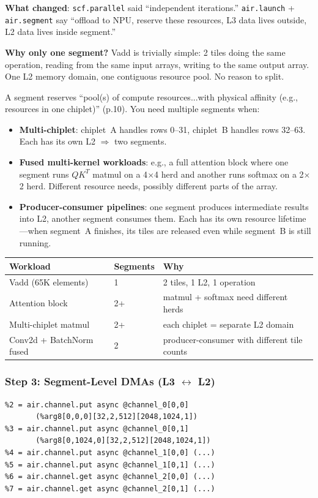 \documentclass[11pt,a4paper]{article}
\begin{document}
\textbf{What changed}: \texttt{scf.parallel} said ``independent iterations.''
\texttt{air.launch} + \texttt{air.segment} say ``offload to NPU, reserve these
resources, L3 data lives outside, L2 data lives inside segment.''

\textbf{Why only one segment?} Vadd is trivially simple: 2 tiles doing the same
operation, reading from the same input arrays, writing to the same output array.
One L2 memory domain, one contiguous resource pool. No reason to split.

A segment reserves ``pool(s) of compute resources...with physical affinity
(e.g., resources in one chiplet)'' (p.10). You need multiple segments when:

\begin{itemize}[leftmargin=2em]
  \item \textbf{Multi-chiplet}: chiplet~A handles rows 0--31, chiplet~B handles
    rows 32--63. Each has its own L2 $\Rightarrow$ two segments.
  \item \textbf{Fused multi-kernel workloads}: e.g., a full attention block where
    one segment runs $QK^T$ matmul on a 4$\times$4 herd and another runs softmax
    on a 2$\times$2 herd. Different resource needs, possibly different parts of
    the array.
  \item \textbf{Producer-consumer pipelines}: one segment produces intermediate
    results into L2, another segment consumes them. Each has its own resource
    lifetime---when segment~A finishes, its tiles are released even while
    segment~B is still running.
\end{itemize}

\begin{center}
\small
\begin{tabular}{lll}
\toprule
\textbf{Workload} & \textbf{Segments} & \textbf{Why} \\
\midrule
Vadd (65K elements) & 1 & 2 tiles, 1 L2, 1 operation \\
Attention block & 2+ & matmul + softmax need different herds \\
Multi-chiplet matmul & 2+ & each chiplet = separate L2 domain \\
Conv2d + BatchNorm fused & 2 & producer-consumer with different tile counts \\
\bottomrule
\end{tabular}
\end{center}

\subsubsection{Step 3: Segment-Level DMAs (L3 $\leftrightarrow$ L2)}
\begin{lstlisting}
%2 = air.channel.put async @channel_0[0,0]
       (%arg8[0,0,0][32,2,512][2048,1024,1])
%3 = air.channel.put async @channel_0[0,1]
       (%arg8[0,1024,0][32,2,512][2048,1024,1])
%4 = air.channel.put async @channel_1[0,0] (...)
%5 = air.channel.put async @channel_1[0,1] (...)
%6 = air.channel.get async @channel_2[0,0] (...)
%7 = air.channel.get async @channel_2[0,1] (...)
\end{lstlisting}
\end{document}
